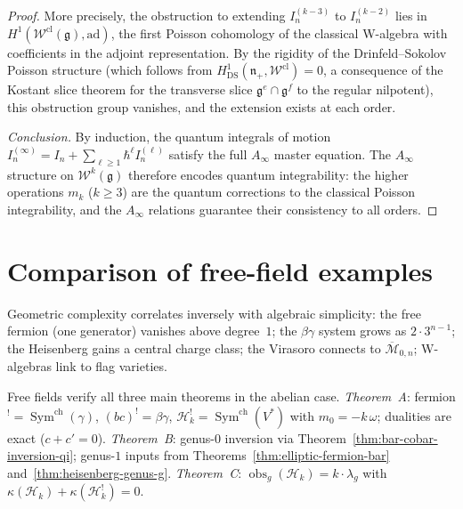 \begin{proof}
More precisely, the obstruction to extending $I_n^{(k-3)}$ to $I_n^{(k-2)}$ lies in $H^1(\mathcal{W}^{\mathrm{cl}}(\mathfrak{g}), \mathrm{ad})$, the first Poisson cohomology of the classical W-algebra with coefficients in the adjoint representation.  By the rigidity of the Drinfeld--Sokolov Poisson structure (which follows from $H^1_{\mathrm{DS}}(\mathfrak{n}_+, \mathcal{W}^{\mathrm{cl}}) = 0$, a consequence of the Kostant slice theorem for the transverse slice $\mathfrak{g}^e \cap \mathfrak{g}^f$ to the regular nilpotent), this obstruction group vanishes, and the extension exists at each order.

\emph{Conclusion.}
By induction, the quantum integrals of motion $I_n^{(\infty)} = I_n + \sum_{\ell \geq 1} \hbar^\ell I_n^{(\ell)}$ satisfy the full $A_\infty$ master equation.  The $A_\infty$ structure on $\mathcal{W}^k(\mathfrak{g})$ therefore encodes quantum integrability: the higher operations $m_k$ ($k \geq 3$) are the quantum corrections to the classical Poisson integrability, and the $A_\infty$ relations guarantee their consistency to all orders.
\end{proof}

\section{Comparison of free-field examples}

Geometric complexity correlates inversely with algebraic simplicity: the free fermion (one generator) vanishes above degree~$1$; the $\beta\gamma$ system grows as $2 \cdot 3^{n-1}$; the Heisenberg gains a central charge class; the Virasoro connects to $\overline{\mathcal{M}}_{0,n}$; W-algebras link to flag varieties.

\begin{remark}
\label{rem:free-field-three-theorems}
Free fields verify all three main theorems in the abelian case.
\emph{Theorem~A}: fermion$^! = \operatorname{Sym}^{\mathrm{ch}}(\gamma)$, $(bc)^! = \beta\gamma$, $\mathcal{H}_k^! = \operatorname{Sym}^{\mathrm{ch}}(V^*)$ with $m_0 = -k\,\omega$; dualities are exact ($c + c' = 0$).
\emph{Theorem~B}: genus-$0$ inversion via Theorem~\ref{thm:bar-cobar-inversion-qi}; genus-$1$ inputs from Theorems~\ref{thm:elliptic-fermion-bar} and~\ref{thm:heisenberg-genus-g}.
\emph{Theorem~C}: $\operatorname{obs}_g(\mathcal{H}_k) = k \cdot \lambda_g$ with $\kappa(\mathcal{H}_k) + \kappa(\mathcal{H}_k^!) = 0$.
\end{remark}

